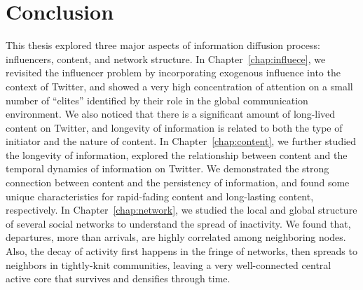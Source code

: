 \documentclass[phd,tocprelim]{cornell}
\begin{document}
\chapter{Conclusion}
\label{chap:conclusion}

This thesis explored three major aspects of information diffusion process: influencers, content, and network structure. In Chapter~\ref{chap:influece}, we revisited the influencer problem by incorporating exogenous influence into the context of Twitter, and showed a very high concentration of attention on a small number of ``elites'' identified by their role in the global communication environment. We also noticed that there is a significant amount of long-lived content on Twitter, and longevity of information is related to both the type of initiator and the nature of content. In Chapter~\ref{chap:content}, we further studied the longevity of information, explored the relationship between content and the temporal dynamics of information on Twitter. We demonstrated the strong connection between content and the persistency of information, and found some unique characteristics for rapid-fading content and long-lasting content, respectively. In Chapter~\ref{chap:network}, we studied the local and global structure of several social networks to understand the spread of inactivity. We found that, departures, more than arrivals, are highly correlated among neighboring nodes. Also, the decay of activity first happens in the fringe of networks, then spreads to neighbors in tightly-knit communities, leaving a very well-connected central active core that survives and densifies through time.


\end{document}
